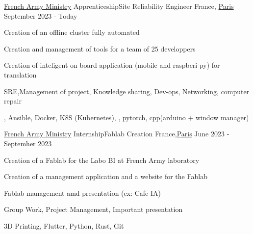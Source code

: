 

\begin{cventries}

	\cventry
	{\href{https://www.defense.gouv.fr/}{French Army Ministry}}
	{Apprenticeship{\enskip\cdotp\enskip}Site Reliability Engineer} %
	{France, \href{https://www.paris.fr/}{Paris}} %
	{September 2023 - Today} %
	{
		\begin{cvitems} %
			\item {Creation of an offline cluster fully automated}
			\item {Creation and management of tools for a team of 25 developpers}
			\item {Creation of inteligent on board application (mobile and raspberi py) for translation}
		\end{cvitems}
	}
	{
		\begin{cvitemsskills} %
			\item {SRE,Management of project, Knowledge sharing, Dev-ops, Networking, computer repair}
			\item {\linux, Ansible, Docker, K8S (Kubernetes), \python, pytorch, cpp(arduino + window manager)}
		\end{cvitemsskills}
	}

	\cventry
	{\href{https://www.defense.gouv.fr/}{French Army Ministry}}
    {Internship{\enskip\cdotp\enskip}Fablab Creation} %
	{France,\href{https://www.paris.fr/}{Paris}} %
	{June 2023 - Septemher 2023} %
	{
		\begin{cvitems} %
			\item {Creation of a Fablab for the Labo BI at French Army laboratory}
			\item {Creation of a management application and a website for the Fablab}
			\item {Fablab management amd presentation (ex: Cafe IA)}
		\end{cvitems}
	}
	{
		\begin{cvitemsskills} %
			\item {Group Work, Project Management, Important presentation}
			\item {3D Printing, Flutter, Python, Rust, Git }
		\end{cvitemsskills}
	}


\end{cventries}
